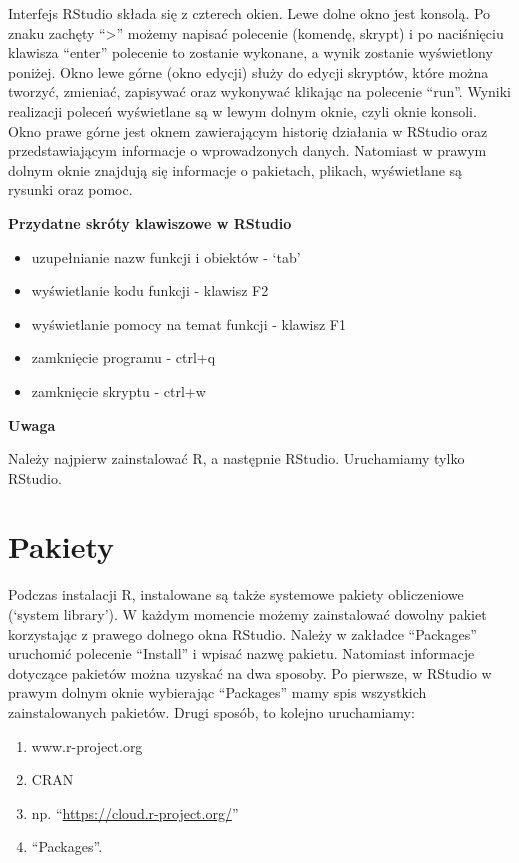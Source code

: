 \documentclass[12pt,B5paper,]{book}
\providecommand{\tightlist}{%
  \setlength{\itemsep}{0pt}\setlength{\parskip}{0pt}}
\begin{document}
Interfejs RStudio składa się z czterech okien. Lewe dolne okno jest
konsolą. Po znaku zachęty ``\textgreater{}'' możemy napisać polecenie
(komendę, skrypt) i po naciśnięciu klawisza ``enter'' polecenie to
zostanie wykonane, a wynik zostanie wyświetlony poniżej. Okno lewe górne
(okno edycji) służy do edycji skryptów, które można tworzyć, zmieniać,
zapisywać oraz wykonywać klikając na polecenie ``run''. Wyniki
realizacji poleceń wyświetlane są w lewym dolnym oknie, czyli oknie
konsoli. Okno prawe górne jest oknem zawierającym historię działania w
RStudio oraz przedstawiającym informacje o wprowadzonych danych.
Natomiast w prawym dolnym oknie znajdują się informacje o pakietach,
plikach, wyświetlane są rysunki oraz pomoc.

\vspace{0.8cm}

\textbf{Przydatne skróty klawiszowe w RStudio}

\begin{itemize}
\item
  uzupełnianie nazw funkcji i obiektów - `tab'
\item
  wyświetlanie kodu funkcji - klawisz F2
\item
  wyświetlanie pomocy na temat funkcji - klawisz F1
\item
  zamknięcie programu - ctrl+q
\item
  zamknięcie skryptu - ctrl+w
\end{itemize}

\textbf{Uwaga}

Należy najpierw zainstalować R, a następnie RStudio. Uruchamiamy tylko
RStudio.

\section{Pakiety}\label{pakiety}

Podczas instalacji R, instalowane są także systemowe pakiety
obliczeniowe (`system library'). W każdym momencie możemy zainstalować
dowolny pakiet korzystając z prawego dolnego okna RStudio. Należy w
zakładce ``Packages'' uruchomić polecenie ``Install'' i wpisać nazwę
pakietu. Natomiast informacje dotyczące pakietów można uzyskać na dwa
sposoby. Po pierwsze, w RStudio w prawym dolnym oknie wybierając
``Packages'' mamy spis wszystkich zainstalowanych pakietów. Drugi
sposób, to kolejno uruchamiamy:

\begin{enumerate}
\def\labelenumi{\arabic{enumi}.}
\tightlist
\item
  www.r-project.org
\item
  CRAN
\item
  np. ``\url{https://cloud.r-project.org/}''
\item
  ``Packages''.
\end{enumerate}
\end{document}
